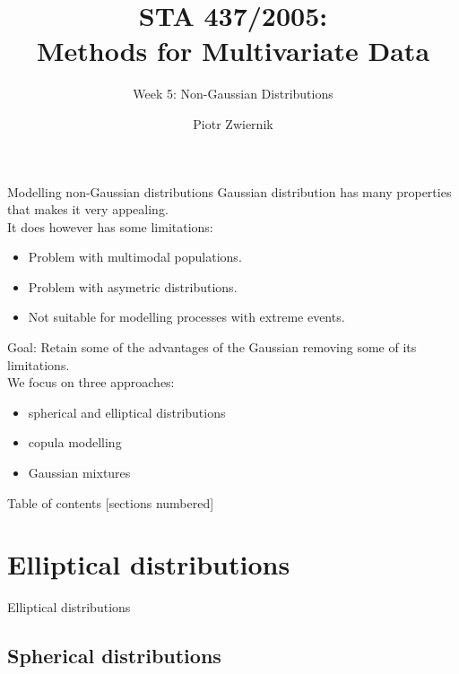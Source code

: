 \documentclass[11pt,handout,aspectratio=169]{beamer}
\title[STA437-Week1]{STA 437/2005: \\ Methods for Multivariate Data}
\subtitle[]{Week 5: Non-Gaussian Distributions}
\author[Piotr Zwiernik]{Piotr Zwiernik}
\institute[UofT]{University of Toronto}
\date{}
\begin{document}
\maketitle

\begin{frame}{Modelling non-Gaussian distributions}
	Gaussian distribution has many properties that makes it very appealing.\\[2mm]
	
	It does however has some limitations:
	\begin{itemize}
		\item Problem with multimodal populations.
		\item Problem with asymetric distributions.
		\item Not suitable for modelling processes with extreme events. \\[3mm]
	\end{itemize}
	
	\alert{Goal:} Retain some of the advantages of the Gaussian removing some of its limitations.\\[3mm]
	We focus on three approaches: 
	\begin{itemize}
		\item spherical and elliptical distributions
		\item copula modelling
		\item Gaussian mixtures
	\end{itemize}
\end{frame}


\begin{frame}{Table of contents}
[sections numbered]
\tableofcontents%
\end{frame}


\section{Elliptical distributions}

\begin{frame}{}
	\begin{center}
		{\Huge \alert{Elliptical distributions}}
	\end{center}
\end{frame}

\subsection{Spherical distributions}
\end{document}
